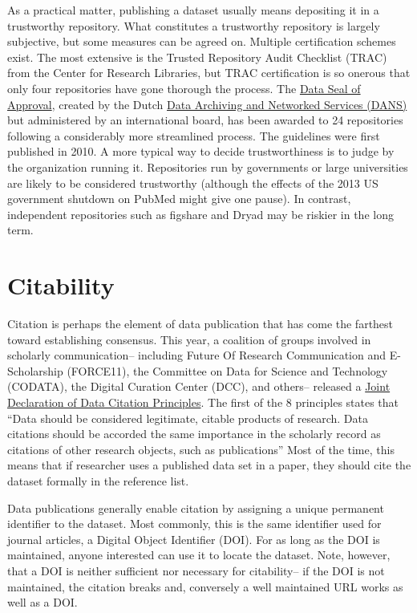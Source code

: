 \documentclass[10pt,twocolumn]{article}
\begin{document}
As a practical matter, publishing a dataset usually means depositing it in a trustworthy repository. 
What constitutes a trustworthy repository is largely subjective, but some measures can be agreed on. 
Multiple certification schemes exist.
The most extensive is the Trusted Repository Audit Checklist (TRAC)\cite{dale_trustworthy_2007} from the Center for Research Libraries, but TRAC certification is so onerous that only four repositories have gone thorough the process. 
The \href{http://datasealofapproval.org/}{Data Seal of Approval}, created by the Dutch \href{http://www.dans.knaw.nl/en}{Data Archiving and Networked Services (DANS)} but administered by an international board, has been awarded to 24 repositories following a considerably more streamlined process. 
The guidelines were first published in 2010.
A more typical way to decide trustworthiness is to judge by the organization running it. 
Repositories run by governments or large universities are likely to be considered trustworthy (although the effects of the 2013 US government shutdown on PubMed might give one pause).
In contrast, independent repositories such as figshare and Dryad may be riskier in the long term. %

\section*{Citability}\label{citability}

Citation is perhaps the element of data publication that has come the farthest toward establishing consensus.  
This year, a coalition of groups involved in scholarly communication– including Future Of Research Communication and E-Scholarship (FORCE11)\cite{bourne_improving_2012}, the Committee on Data for Science and Technology (CODATA)\cite{codata-icsti_task_group_on_data_citation_standards_and_practices_out_2013}, the Digital Curation Center (DCC), and others– released a \href{http://www.force11.org/datacitation}{Joint Declaration of Data Citation Principles}.
The first of the 8 principles states that 
``Data should be considered legitimate, citable products of research. Data citations should be accorded the same importance in the scholarly record as citations of other research objects, such as publications''
Most of the time, this means that if researcher uses a published data set in a paper, they should cite the dataset formally in the reference list. 
	
Data publications generally enable citation by assigning a unique permanent identifier to the dataset.
Most commonly, this is the same identifier used for journal articles, a Digital Object Identifier (DOI).
For as long as the DOI is maintained, anyone interested can use it to locate the dataset. 
Note, however, that a DOI is neither sufficient nor necessary for citability-- if the DOI is not maintained, the citation breaks and, conversely a well maintained URL works as well as a DOI. 
\end{document}
